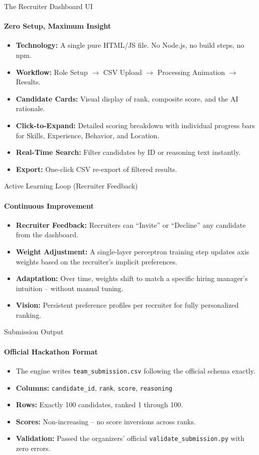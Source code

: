\documentclass[aspectratio=169]{beamer}
\begin{document}
\begin{frame}{The Recruiter Dashboard UI}
  \framesubtitle{Zero Setup, Maximum Insight}
  \begin{itemize}
    \item \textbf{Technology:} A single pure HTML/JS file. No Node.js, no build steps, no npm.
    \item \textbf{Workflow:} Role Setup $\rightarrow$ CSV Upload $\rightarrow$ Processing Animation $\rightarrow$ Results.
    \item \textbf{Candidate Cards:} Visual display of rank, composite score, and the AI rationale.
    \item \textbf{Click-to-Expand:} Detailed scoring breakdown with individual progress bars for Skills, Experience, Behavior, and Location.
    \item \textbf{Real-Time Search:} Filter candidates by ID or reasoning text instantly.
    \item \textbf{Export:} One-click CSV re-export of filtered results.
  \end{itemize}
\end{frame}

\begin{frame}{Active Learning Loop (Recruiter Feedback)}
  \framesubtitle{Continuous Improvement}
  \begin{itemize}
    \item \textbf{Recruiter Feedback:} Recruiters can ``Invite'' or ``Decline'' any candidate from the dashboard.
    \item \textbf{Weight Adjustment:} A single-layer perceptron training step updates axis weights based on the recruiter's implicit preferences.
    \item \textbf{Adaptation:} Over time, weights shift to match a specific hiring manager's intuition -- without manual tuning.
    \item \textbf{Vision:} Persistent preference profiles per recruiter for fully personalized ranking.
  \end{itemize}
\end{frame}

\begin{frame}{Submission Output}
  \framesubtitle{Official Hackathon Format}
  \begin{itemize}
    \item The engine writes \texttt{team\_submission.csv} following the official schema exactly.
    \item \textbf{Columns:} \texttt{candidate\_id}, \texttt{rank}, \texttt{score}, \texttt{reasoning}
    \item \textbf{Rows:} Exactly 100 candidates, ranked 1 through 100.
    \item \textbf{Scores:} Non-increasing -- no score inversions across ranks.
    \item \textbf{Validation:} Passed the organizers' official \texttt{validate\_submission.py} with zero errors.
  \end{itemize}
\end{frame}
\end{document}
